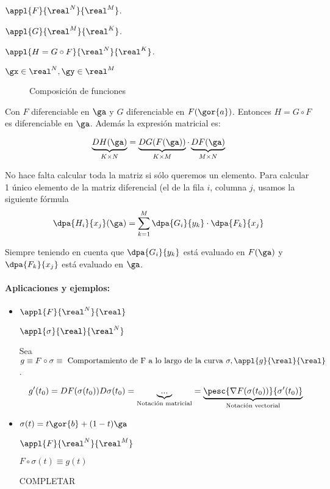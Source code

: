 \documentclass{apuntes}
\begin{document}
$\appl{F}{\real^N}{\real^M}$. 

$\appl{G}{\real^M}{\real^K}$.

$\appl{H=G\circ F}{\real^N}{\real^K}$.

$ \gx \in \real^N, \gy \in \real^M$

\begin{wrapfigure}{r}{0.3\textwidth}
\begin{center}
\end{center}
\caption{Composición de funciones}
\end{wrapfigure}

Con $F$ diferenciable en $\ga$ y $G$ diferenciable en $F(\gor{a})$. Entonces $H=G\circ F$ es diferenciable en $\ga $.
Además la expresión matricial es:

\[ \underbrace{DH(\ga)}_{K\times N} = \underbrace{DG(F(\ga))}_{K\times M}\cdot \underbrace{DF(\ga)}_{M\times N} \]
 
No hace falta calcular toda la matriz si sólo queremos un elemento. Para calcular 1 único elemento de la matriz diferencial (el de la fila $i$, columna $j$, usamos la siguiente fórmula
\[ \dpa{H_i}{x_j}(\ga) = \sum_{k=1}^M \dpa{G_i}{y_k}\cdot\dpa{F_k}{x_j} \]

Siempre teniendo en cuenta que $\displaystyle\dpa{G_i}{y_k}$ está evaluado en $F(\ga)$ y $\displaystyle\dpa{F_k}{x_j}$ está evaluado en $\ga$.


\paragraph{Aplicaciones y ejemplos:}
\begin{itemize}
 \item 
 $\appl{F}{\real^N}{\real}$
 
 $\appl{\sigma}{\real}{\real^N}$
 
 Sea $g\equiv F\circ \sigma \equiv \text{ Comportamiento de F a lo largo de la curva } \sigma, \appl{g}{\real}{\real}$.

$$g'(t_0) = DF(\sigma(t_0))D\sigma(t_0) = \underbrace{...}_{\text{Notación matricial}} = \underbrace{\pesc{\nabla F(\sigma(t_0))}{\sigma'(t_0)}}_{\text{Notación vectorial}}$$

 
 \item 
 $\sigma(t) = t\gor{b} + (1-t)\ga$
 
 $\appl{F}{\real^N}{\real^M}$
 
 $F\circ \sigma(t) \equiv g(t)$
 
 COMPLETAR
\end{itemize}
\end{document}
